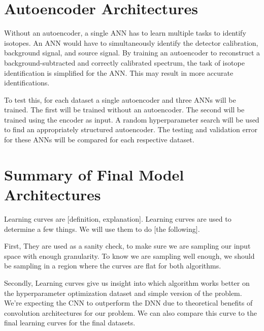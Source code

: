 \section{Autoencoder Architectures}

Without an autoencoder, a single ANN has to learn multiple tasks to identify isotopes. An ANN would have to simultaneously identify the detector calibration, background signal, and source signal. By training an autoencoder to reconstruct a background-subtracted and correctly calibrated spectrum, the task of isotope identification is simplified for the ANN. This may result in more accurate identifications. 




To test this, for each dataset a single autoencoder and three ANNs will be trained. The first will be trained without an autoencoder. The second will be trained using the encoder as input. A random hyperparameter search will be used to find an appropriately structured autoencoder. The testing and validation error for these ANNs will be compared for each respective dataset.


\section{Summary of Final Model Architectures}

Learning curves are [definition, explanation]. Learning curves are used to determine a few things. We will use them to do [the following].

First, They are used as a sanity check, to make sure we are sampling our input space with enough granularity. To know we are sampling well enough, we should be sampling in a region where the curves are flat for both algorithms.

Secondly, Learning curves give us insight into which algorithm works better on the hyperparameter optimization dataset and simple version of the problem. We're expecting the CNN to outperform the DNN due to theoretical benefits of convolution architectures for our problem. We can also compare this curve to the final learning curves for the final datasets.




